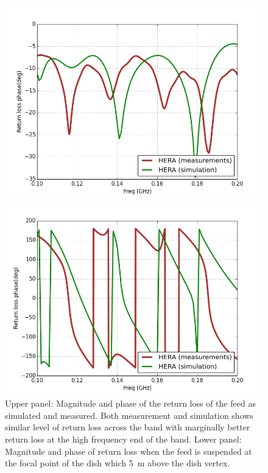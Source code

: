 \documentclass[twocolumn]{emulateapj}
\begin{document}
\begin{figure}[ht]
\begin{minipage}[b]{0.5\linewidth}
\includegraphics[angle=0, width=\linewidth]{GB_reflectometry_part3/plot/RL_mag_dish.png}
\end{minipage}
\hspace{0.1cm}
\begin{minipage}[b]{0.5\linewidth}
\centering
\includegraphics[angle=0, width=\linewidth]{GB_reflectometry_part3/plot/RL_ph_HERA.png}
\end{minipage}
\caption{Upper panel: Magnitude and phase of the return loss of the feed as simulated and measured. Both measurement and simulation shows similar level of return loss across the band with marginally better return loss at the high frequency end of the band. Lower panel: Magnitude and phase of return loss when the feed is suspended at the focal point of the dish which 5~m above the dish vertex.}   
\label{RL_mag_dish}
\end{figure}
\end{document}

